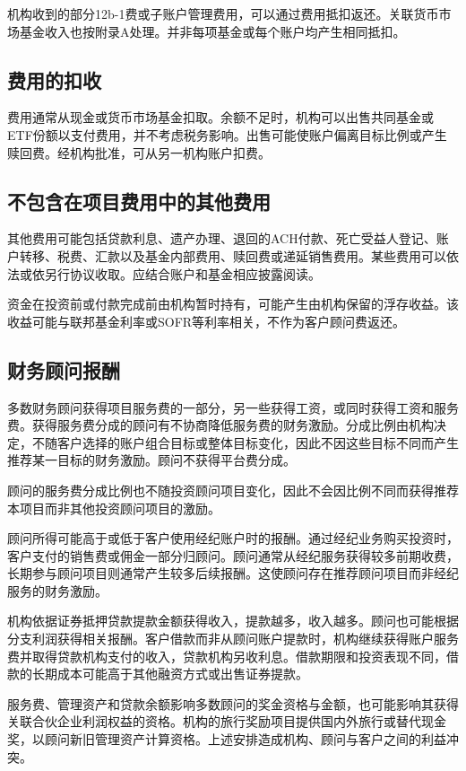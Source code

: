 \documentclass[UTF8,fontset=none,11pt,a4paper]{ctexart}
\begin{document}
机构收到的部分12b-1费或子账户管理费用，可以通过费用抵扣返还。关联货币市场基金收入也按附录A处理。并非每项基金或每个账户均产生相同抵扣。


\subsection*{费用的扣收}
费用通常从现金或货币市场基金扣取。余额不足时，机构可以出售共同基金或ETF份额以支付费用，并不考虑税务影响。出售可能使账户偏离目标比例或产生赎回费。经机构批准，可从另一机构账户扣费。


\subsection*{不包含在项目费用中的其他费用}
其他费用可能包括贷款利息、遗产办理、退回的ACH付款、死亡受益人登记、账户转移、税费、汇款以及基金内部费用、赎回费或递延销售费用。某些费用可以依法或依另行协议收取。应结合账户和基金相应披露阅读。


资金在投资前或付款完成前由机构暂时持有，可能产生由机构保留的浮存收益。该收益可能与联邦基金利率或SOFR等利率相关，不作为客户顾问费返还。


\subsection*{财务顾问报酬}
多数财务顾问获得项目服务费的一部分，另一些获得工资，或同时获得工资和服务费。获得服务费分成的顾问有不协商降低服务费的财务激励。分成比例由机构决定，不随客户选择的账户组合目标或整体目标变化，因此不因这些目标不同而产生推荐某一目标的财务激励。顾问不获得平台费分成。


顾问的服务费分成比例也不随投资顾问项目变化，因此不会因比例不同而获得推荐本项目而非其他投资顾问项目的激励。


顾问所得可能高于或低于客户使用经纪账户时的报酬。通过经纪业务购买投资时，客户支付的销售费或佣金一部分归顾问。顾问通常从经纪服务获得较多前期收费，长期参与顾问项目则通常产生较多后续报酬。这使顾问存在推荐顾问项目而非经纪服务的财务激励。


机构依据证券抵押贷款提款金额获得收入，提款越多，收入越多。顾问也可能根据分支利润获得相关报酬。客户借款而非从顾问账户提款时，机构继续获得账户服务费并取得贷款机构支付的收入，贷款机构另收利息。借款期限和投资表现不同，借款的长期成本可能高于其他融资方式或出售证券提款。


服务费、管理资产和贷款余额影响多数顾问的奖金资格与金额，也可能影响其获得关联合伙企业利润权益的资格。机构的旅行奖励项目提供国内外旅行或替代现金奖，以顾问新旧管理资产计算资格。上述安排造成机构、顾问与客户之间的利益冲突。
\end{document}
